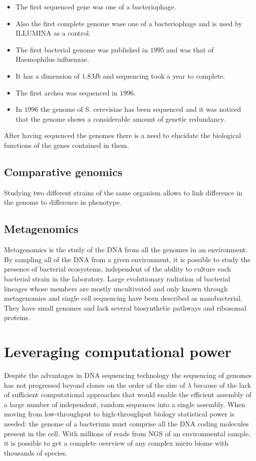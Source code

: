 	\begin{multicols}{2}
		\begin{itemize}
			\item The first sequenced gene was one of a bacteriophage.
			\item Also the first complete genome wase one of a bacteriophage and is used by ILLUMINA as a control.
			\item The first bacterial genome was published in $1995$ and was that of Haemophilus influenzae.
			\item It has a dimension of $1.8Mb$ and sequencing took a year to complete.
			\item The first archea was sequenced in $1996$.
			\item In $1996$ the genome of S. cerevisiae has been sequenced and it was noticed that the genome shows a considerable amount of genetic redundancy.
		\end{itemize}
	\end{multicols}
	After having sequenced the genomes there is a need to elucidate the biological functions of the genes contained in them.

	\subsection{Comparative genomics}
	Studying two different strains of the same organism allows to link difference in the genome to difference in phenotype.

	\subsection{Metagenomics}
	Metagenomics is the study of the DNA from all the genomes in an environment.
	By sampling all of the DNA from a given environment, it is possible to study the presence of bacterial ecosystems, independent of the ability to culture each bacterial strain in the laboratory.
	Large evolutionary radiation of bacterial lineages whose members are mostly uncultivated and only known through metagenomics and single cell sequencing have been described as nanobacterial.
	They have small genomes and lack several biosynthetic pathways and ribosomal proteins.

\section{Leveraging computational power}
Despite the advantages in DNA sequencing technology the sequencing of genomes has not progressed beyond clones on the order of the size of $\lambda$ because of the lack of sufficient computational approaches that would enable the efficient assembly of a large number of independent, random sequences into a single assembly.
When moving from low-throughput to high-throughput biology statistical power is needed: the genome of a bacterium must comprise all the DNA coding molecules present in the cell.
With millions of reads from NGS of an environmental sample, it is possible to get a complete overview of any complex micro biome with thousands of species.

